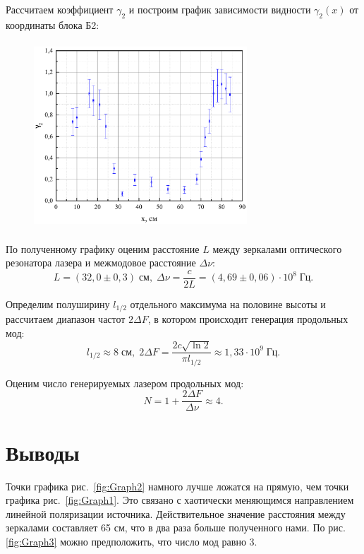\documentclass[a4paper,12pt]{article} %
\begin{document}
		Рассчитаем коэффициент $\gamma_2$ и построим график зависимости видности $\gamma_2(x)$ от координаты блока Б2:
		\begin{figure}[h!]
			\begin{floatrow}
				{\includegraphics[width=8cm,height=7cm]{graph3}}       
			\end{floatrow}
		\end{figure}
	
		По полученному графику оценим расстояние $L$ между зеркалами оптического резонатора лазера и межмодовое расстояние $\Delta\nu$:
		\begin{equation}
		L = (32,0\pm 0,3) \; \text{см}, \; \Delta\nu = \frac{c}{2L} = (4,69\pm 0,06)\cdot 10^8 \; \text{Гц}.
		\end{equation}
		
		Определим полуширину $l_{1/2}$ отдельного максимума на половине высоты и рассчитаем диапазон частот $2\Delta F$, в котором происходит генерация продольных мод:
		\begin{equation}
		l_{1/2} \approx 8\; \text{см}, \; 2\Delta F = \frac{2c\sqrt{\ln 2}}{\pi l_{1/2}} \approx 1,33\cdot 10^9 \; \text{Гц}.
		\end{equation}
		
	    Оценим число генерируемых лазером продольных мод:
		\begin{equation}
		N = 1 + \frac{2\Delta F }{\Delta\nu} \approx 4.
		\end{equation}

\newpage
\section{Выводы}
	Точки графика рис.~\ref{fig:Graph2} намного лучше ложатся на прямую, чем точки графика рис.~\ref{fig:Graph1}. Это связано с хаотически меняющимся направлением линейной поляризации источника. Действительное значение расстояния между зеркалами составляет 65 см, что в два раза больше полученного нами. По рис. \ref{fig:Graph3} можно предположить, что число мод равно 3.
	
	
	
	
	
	
	
	
	
	
	
	
	
	
	
	
	
	
	
	
	
	
	
	
\end{document}
